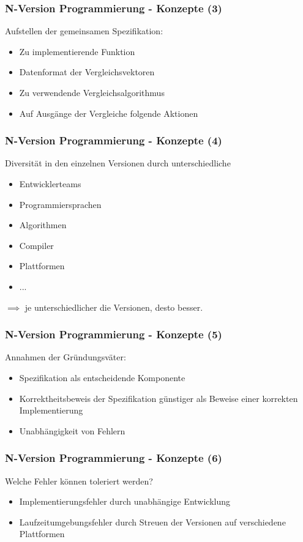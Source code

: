 %
%
\begin{frame}
	\frametitle{N-Version Programmierung - Konzepte (3)}
	Aufstellen der gemeinsamen Spezifikation:
	\begin{itemize}
		\item Zu implementierende Funktion
		\item Datenformat der Vergleichsvektoren
		\item Zu verwendende Vergleichsalgorithmus
		\item Auf Ausgänge der Vergleiche folgende Aktionen
	\end{itemize}
\end{frame}
%
%
\begin{frame}
	\frametitle{N-Version Programmierung - Konzepte (4)}
	Diversität in den einzelnen Versionen durch unterschiedliche
	\begin{itemize}
		\item Entwicklerteams
		\item Programmiersprachen
		\item Algorithmen
		\item Compiler
		\item Plattformen
		\item ...
	\end{itemize}
	$\implies$ je unterschiedlicher die Versionen, desto besser.
\end{frame}
%
%
\begin{frame}
	\frametitle{N-Version Programmierung - Konzepte (5)}
	Annahmen der Gründungsväter:
	\begin{itemize}		
		\item Spezifikation als entscheidende Komponente		
		\item Korrektheitsbeweis der Spezifikation günstiger als Beweise einer korrekten Implementierung
		\item Unabhängigkeit von Fehlern
	\end{itemize}
\end{frame}
%
%
\begin{frame}
	\frametitle{N-Version Programmierung - Konzepte (6)}
	Welche Fehler können toleriert werden?
	\begin{itemize}		
		\item Implementierungsfehler durch unabhängige Entwicklung
		\item Laufzeitumgebungsfehler durch Streuen der Versionen auf verschiedene Plattformen
	\end{itemize}
\end{frame}
%
%
